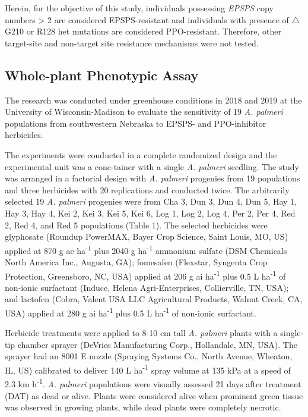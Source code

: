 \documentclass[10pt,letterpaper]{article}
\begin{document}
Herein, for the objective of this study, individuals possessing
\emph{EPSPS} copy numbers \textgreater{} 2 are considered
EPSPS-resistant and individuals with presence of \(\triangle\)G210 or
R128 het mutations are considered PPO-resistant. Therefore, other
target-site and non-target site resistance mechanisms were not tested.

\hypertarget{whole-plant-phenotypic-assay}{%
\subsection{Whole-plant Phenotypic
Assay}\label{whole-plant-phenotypic-assay}}

The research was conducted under greenhouse conditions in 2018 and 2019
at the University of Wisconsin-Madison to evaluate the sensitivity of 19
\emph{A. palmeri} populations from southwestern Nebraska to EPSPS- and
PPO-inhibitor herbicides.

The experiments were conducted in a complete randomized design and the
experimental unit was a cone-tainer with a single \emph{A. palmeri}
seedling. The study was arranged in a factorial design with \emph{A.
palmeri} progenies from 19 populations and three herbicides with 20
replications and conducted twice. The arbitrarily selected 19 \emph{A.
palmeri} progenies were from Cha 3, Dun 3, Dun 4, Dun 5, Hay 1, Hay 3,
Hay 4, Kei 2, Kei 3, Kei 5, Kei 6, Log 1, Log 2, Log 4, Per 2, Per 4,
Red 2, Red 4, and Red 5 populations (Table 1). The selected herbicides
were glyphosate (Roundup PowerMAX\textsuperscript \textregistered, Bayer
Crop Science, Saint Louis, MO, US) applied at 870 g ae
ha\textsuperscript{-1} plus 2040 g ha\textsuperscript{-1} ammonium
sulfate (DSM Chemicals North America Inc., Augusta, GA); fomesafen
(Flexstar\textsuperscript \textregistered, Syngenta Crop Protection,
Greensboro, NC, USA) applied at 206 g ai ha\textsuperscript{-1} plus 0.5
L ha\textsuperscript{-1} of non-ionic surfactant
(Induce\textsuperscript \textregistered, Helena Agri-Enterprises,
Collierville, TN, USA); and lactofen
(Cobra\textsuperscript \textregistered, Valent USA LLC Agricultural
Products, Walnut Creek, CA, USA) applied at 280 g ai
ha\textsuperscript{-1} plus 0.5 L ha\textsuperscript{-1} of non-ionic
surfactant.

Herbicide treatments were applied to 8-10 cm tall \emph{A. palmeri}
plants with a single-tip chamber sprayer (DeVries Manufacturing Corp.,
Hollandale, MN, USA). The sprayer had an 8001 E nozzle (Spraying Systems
Co., North Avenue, Wheaton, IL, US) calibrated to deliver 140 L
ha\textsuperscript{-1} spray volume at 135 kPa at a speed of 2.3 km
h\textsuperscript{-1}. \emph{A. palmeri} populations were visually
assessed 21 days after treatment (DAT) as dead or alive. Plants were
considered alive when prominent green tissue was observed in growing
plants, while dead plants were completely necrotic.
\end{document}
